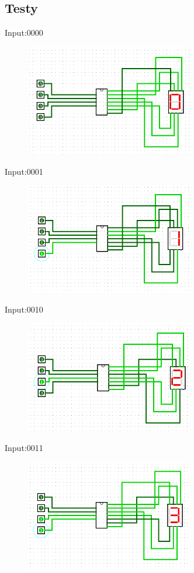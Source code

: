 \documentclass[]{article}
\begin{document}
\subsection{Testy}
Input:0000
\begin{figure}[H]
	\centering
	\includegraphics[width=0.65\textwidth]{0.png}
\end{figure}
Input:0001
\begin{figure}[H]
	\centering
	\includegraphics[width=0.65\textwidth]{1.png}
\end{figure}
Input:0010
\begin{figure}[H]
	\centering
	\includegraphics[width=0.65\textwidth]{2.png}
\end{figure}
Input:0011
\begin{figure}[H]
	\centering
	\includegraphics[width=0.65\textwidth]{3.png}
\end{figure}
\end{document}
